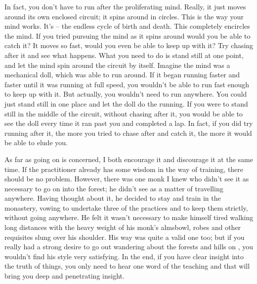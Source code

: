 In fact, you don't have to run after the proliferating mind. Really, it just moves around its own enclosed circuit; it spins around in circles. This is the way your mind works. It's  -- the endless cycle of birth and death. This completely encircles the mind. If you tried pursuing the mind as it spins around would you be able to catch it? It moves so fast, would you even be able to keep up with it? Try chasing after it and see what happens. What you need to do is stand still at one point, and let the mind spin around the circuit by itself. Imagine the mind was a mechanical doll, which was able to run around. If it began running faster and faster until it was running at full speed, you wouldn't be able to run fast enough to keep up with it. But actually, you wouldn't need to run anywhere. You could just stand still in one place and let the doll do the running. If you were to stand still in the middle of the circuit, without chasing after it, you would be able to see the doll every time it ran past you and completed a lap. In fact, if you did try running after it, the more you tried to chase after and catch it, the more it would be able to elude you. 

As far as going on  is concerned, I both encourage it and discourage it at the same time. If the practitioner already has some wisdom in the way of training, there should be no problem. However, there was one monk I knew who didn't see it as necessary to go on  into the forest; he didn't see  as a matter of travelling anywhere. Having thought about it, he decided to stay and train in the monastery, vowing to undertake three of the  practices and to keep them strictly, without going anywhere. He felt it wasn't necessary to make himself tired walking long distances with the heavy weight of his monk's almsbowl, robes and other requisites slung over his shoulder. His way was quite a valid one too; but if you really had a strong desire to go out wandering about the forests and hills on , you wouldn't find his style very satisfying. In the end, if you have clear insight into the truth of things, you only need to hear one word of the teaching and that will bring you deep and penetrating insight.

